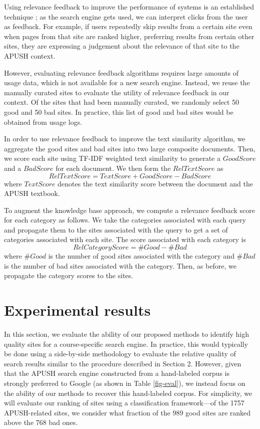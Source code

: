 \documentclass[pdfpagelabels=false,plainpages=true]{acm_proc_article-sp}
\begin{document}
Using relevance feedback to improve the performance of systems is an established
technique \cite{salton1997improving}; as the search engine gets used, we can
interpret clicks from the user as feedback. For example, if users repeatedly
skip results from a certain site even when pages from that site are ranked
higher, preferring results from certain other sites, they are expressing a
judgement about the relevance of that site to the APUSH context. 

However, evaluating relevance feedback algorithms requires large amounts of
usage data, which is not available for a new search engine. Instead, we 
reuse the manually curated sites to evaluate the utility of relevance feedback
in our context. Of the sites that had been manually curated, we randomly
select 50 good and 50 bad sites. In practice, this list of good and bad
sites would be obtained from usage logs. 

In order to use relevance feedback to improve the text similarity algorithm, we
aggregate the good sites and bad sites into two large composite documents. Then,
we score each site using TF-IDF weighted text similarity to generate a
$GoodScore$ and a $BadScore$ for each document. We then form the $RelTextScore$ as 
\begin{equation}
RelTextScore = TextScore + GoodScore - BadScore
\end{equation}
where $TextScore$ denotes the text similarity score between the document and
the APUSH textbook.

To augment the knowledge base approach, we compute a relevance feedback score
for each category as follows. We take the categories associated with each query 
and propagate them to the sites associated with the query to get
a set of categories associated with each site. The score associated with each
category is 
\begin{equation}
RelCategoryScore = \#Good - \#Bad
\end{equation}
where $\#Good$ is the number of good sites associated with the category and $\#Bad$ is
the number of bad sites associated with the category. Then, as before, we
propagate the category scores to the sites.   

\section{Experimental results}

In this section, we evaluate the ability of our proposed methods to identify
high quality sites for a course-specific search engine. In practice, this
would typically be done using a side-by-side methodology to evaluate the
relative quality of search results similar to the procedure described in Section
2. However, given that the APUSH search engine constructed from a hand-labeled
corpus is strongly preferred to Google (as shown in Table \ref{fig-eval}), we
instead focus on the ability of our methods to recover this hand-labeled
corpus. For simplicity, we will evaluate our ranking of sites using a 
classification framework---of the 1757 APUSH-related sites, we consider what
fraction of the 989 good sites are ranked above the 768 bad ones.
\end{document}
